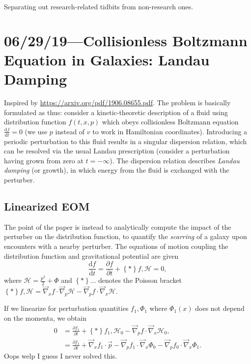 \documentclass[12pt]{article}
\newcommand*{\rd}[2]{\frac{\mathrm{d}#1}{\mathrm{d}#2}}
\newcommand*{\pd}[2]{\frac{\partial#1}{\partial#2}}
\newcommand*{\z}[1]{\left\{#1\right\}}
\begin{document}
\pagestyle{fancy}
\cfoot{\thepage/\pageref{LastPage}}

Separating out research-related tidbits from non-research ones.

\tableofcontents

\section{06/29/19---Collisionless Boltzmann Equation in Galaxies: Landau Damping}

Inspired by \url{https://arxiv.org/pdf/1906.08655.pdf}. The problem is basically
formulated as thus: consider a kinetic-theoretic description of a fluid using
distribution function $f(t, x, p)$ which obeys collisionless Boltzmann equation
$\rd{f}{t} = 0$ (we use $p$ instead of $v$ to work in Hamiltonian coordinates).
Introducing a periodic perturbation to this fluid results in a singular
dispersion relation, which can be resolved via the usual Landau prescription
(consider a perturbation having grown from zero at $t=-\infty$). The dispersion
relation describes \emph{Landau damping} (or growth), in which energy from the
fluid is exchanged with the perturber.

\subsection{Linearized EOM}

The point of the paper is instead to analytically compute the impact of the
perturber on the distribution function, to quantify the \emph{scarring} of a
galaxy upon encounters with a nearby perturber. The equations of motion coupling
the distribution function and gravitational potential are given
\begin{equation}
    \rd{f}{t} = \pd{f}{t} + \z*{f, \mathcal{H}} = 0,
\end{equation}
where $\mathcal{H} = \frac{p^2}{2} + \Phi$ and $\z*{\dots}$ denotes the Poisson
bracket $\z*{f, \mathcal{H}} = \vec{\nabla}_xf \cdot \vec{\nabla}_p \mathcal{H}
- \vec{\nabla}_pf \cdot \vec{\nabla}_x\mathcal{H}$.

If we linearize for perturbation quantities $f_1, \Phi_1$ where $\Phi_1(x)$ does
not depend on the momenta, we obtain
\begin{align*}
    0 &= \pd{f_1}{t} + \z*{f_1, \mathcal{H}_0}
            - \vec{\nabla}_pf \cdot \vec{\nabla}_x \mathcal{H}_0,\\
        &= \pd{f_1}{t} + \vec{\nabla}_x f_1 \cdot \vec{p}
            - \vec{\nabla}_p f_1 \cdot \vec{\nabla}_x \Phi_0
            - \vec{\nabla}_p f_0 \cdot \vec{\nabla}_x \Phi_1.
\end{align*}
Oops welp I guess I never solved this.
\end{document}
